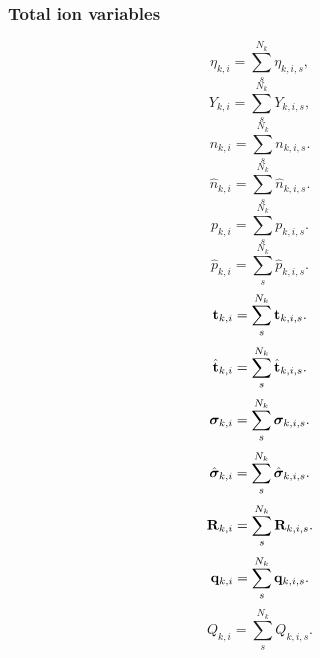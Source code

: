 \documentclass[a4paper,11pt]{report}
\begin{document}
\subsubsection{Total ion variables}

\begin{equation}
    \label{eq:sf_vars_eta_ki}
    \eta_{k,i} = \sum_s^{N_k} \eta_{k,i,s}, 
\end{equation}
\begin{equation}
    \label{eq:sf_vars_Y_ki}
    Y_{k,i} = \sum_s^{N_k} Y_{k,i,s}, 
\end{equation}
\begin{equation}
    \label{eq:sf_vars_n_ki}
    n_{k,i} = \sum_s^{N_k} n_{k,i,s}. 
\end{equation}
\begin{equation}
    \label{eq:sf_vars_hatn_ki}
    \hat{n}_{k,i} = \sum_s^{N_k} \hat{n}_{k,i,s}. 
\end{equation}
\begin{equation}
    \label{eq:sf_vars_p_ki}
    p_{k,i} = \sum_s^{N_k} p_{k,i,s}.
\end{equation}
\begin{equation}
    \label{eq:sf_vars_hatp_ki}
    \hat{p}_{k,i} = \sum_s^{N_k} \hat{p}_{k,i,s}. 
\end{equation}
\begin{equation}
    \label{eq:sf_vars_t_ki}
    \mathbf{t}_{k,i} = \sum_s^{N_k} \mathbf{t}_{k,i,s}.
\end{equation}
\begin{equation}
    \label{eq:sf_vars_hatt_ki}
    \hat{\mathbf{t}}_{k,i} = \sum_s^{N_k} \hat{\mathbf{t}}_{k,i,s}. 
\end{equation}
\begin{equation}
    \label{eq:sf_vars_sig_ki}
    \bm \sigma_{k,i} = \sum_s^{N_k} \bm \sigma_{k,i,s}.
\end{equation}
\begin{equation}
    \label{eq:sf_vars_hatsig_ki}
    \hat{\bm \sigma}_{k,i} = \sum_s^{N_k} \hat{\bm \sigma}_{k,i,s}.
\end{equation}
\begin{equation}
    \label{eq:sf_vars_R_ki}
    \mathbf{R}_{k,i} = \sum_s^{N_k} \mathbf{R}_{k,i,s}.
\end{equation}
\begin{equation}
    \label{eq:sf_vars_q_ki}
    \mathbf{q}_{k,i} = \sum_s^{N_k} \mathbf{q}_{k,i,s}.
\end{equation}
\begin{equation}
    \label{eq:sf_vars_Q_ki}
    Q_{k,i} = \sum_s^{N_k} Q_{k,i,s}.
\end{equation}
\end{document}
